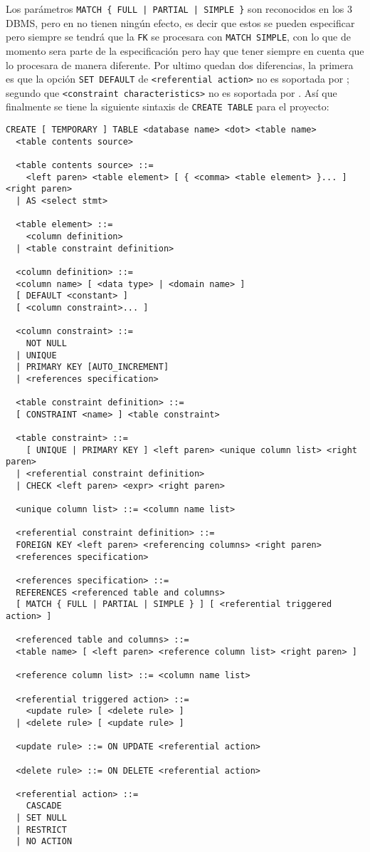 %
Los parámetros \verb=MATCH { FULL | PARTIAL | SIMPLE }= son reconocidos en los 3 DBMS, pero en \s no tienen ningún efecto, es decir que estos se pueden especificar pero siempre se tendrá que la \verb=FK= se procesara con \verb=MATCH SIMPLE=, con lo que de momento sera parte de la especificación pero hay que tener siempre en cuenta que \s lo procesara de manera diferente. Por ultimo quedan dos diferencias, la primera es que la opción \verb=SET DEFAULT= de \verb=<referential action>= no es soportada por \m; segundo que \verb=<constraint characteristics>= no es soportada por \m.
%
%
%
%
Así que finalmente se tiene la siguiente sintaxis de \verb=CREATE TABLE= para el proyecto:
%
\begin{Verbatim}[frame=single, label=sintaxis para CREATE TABLE]
  CREATE [ TEMPORARY ] TABLE <database name> <dot> <table name> 
  <table contents source>

  <table contents source> ::=
    <left paren> <table element> [ { <comma> <table element> }... ] <right paren>
  | AS <select stmt>
  
  <table element> ::=
    <column definition>
  | <table constraint definition>

  <column definition> ::=
  <column name> [ <data type> | <domain name> ]
  [ DEFAULT <constant> ]
  [ <column constraint>... ]
  
  <column constraint> ::=
    NOT NULL
  | UNIQUE
  | PRIMARY KEY [AUTO_INCREMENT]
  | <references specification>

  <table constraint definition> ::=
  [ CONSTRAINT <name> ] <table constraint>

  <table constraint> ::=
    [ UNIQUE | PRIMARY KEY ] <left paren> <unique column list> <right paren>
  | <referential constraint definition>
  | CHECK <left paren> <expr> <right paren>

  <unique column list> ::= <column name list>

  <referential constraint definition> ::=
  FOREIGN KEY <left paren> <referencing columns> <right paren>
  <references specification>
  
  <references specification> ::=
  REFERENCES <referenced table and columns>
  [ MATCH { FULL | PARTIAL | SIMPLE } ] [ <referential triggered action> ]

  <referenced table and columns> ::=
  <table name> [ <left paren> <reference column list> <right paren> ]

  <reference column list> ::= <column name list>

  <referential triggered action> ::=
    <update rule> [ <delete rule> ]
  | <delete rule> [ <update rule> ]

  <update rule> ::= ON UPDATE <referential action>

  <delete rule> ::= ON DELETE <referential action>

  <referential action> ::=
    CASCADE
  | SET NULL
  | RESTRICT
  | NO ACTION


\end{Verbatim}
%
%
%
%
